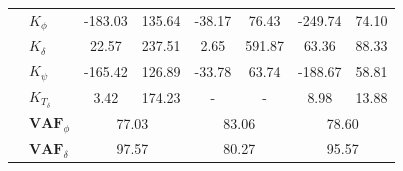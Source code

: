 \begin{table}[]
\begin{tabular}{llcccccc}
                                                   & $K_{\phi} $                                                        & -183.03                                     & 135.64                                              & -38.17                                      & 76.43                                               & -249.74                                     & 74.10                                               \\
                                                   & $K_\delta $                                                        & 22.57                                       & 237.51                                              & 2.65                                        & 591.87                                              & 63.36                                       & 88.33                                               \\
                                                   & $K_\psi $                                                          & -165.42                                     & 126.89                                              & -33.78                                      & 63.74                                               & -188.67                                     & 58.81                                               \\
                                                   & $K_{T_\delta}$                                                     & 3.42                                        & 174.23                                              & -                                           & -                                                   & 8.98                                        & 13.88                                               \\ \cline{2-8} 
                                                   & $\mathbf{VAF}_\phi$                                                & \multicolumn{2}{c}{77.03}                                                                         & \multicolumn{2}{c}{83.06}                                                                         & \multicolumn{2}{c}{78.60}                                                                         \\
                                                   & $\mathbf{VAF}_\delta$                                              & \multicolumn{2}{c}{97.57}                                                                         & \multicolumn{2}{c}{80.27}                                                                         & \multicolumn{2}{c}{95.57}                                                                         \\

\end{tabular}
\end{table}

